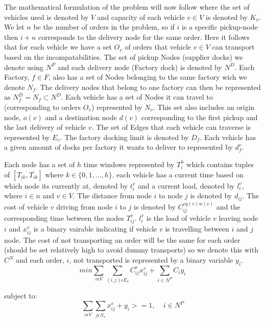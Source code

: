 \documentclass[a4paper,12pt]{article}
\begin{document}
The mathematical formulation of the problem will now follow where the set of vehicles used is denoted by $V$ and capacity of each vehicle $v \in V$ is denoted by $K_v$. We let $n$ be the number of orders in the problem, so if $i$ is a specific pickup-node then $i+n$ corresponds to the delivery node for the same order. Here it follows that for each vehicle we have a set $O_v$ of orders that vehicle $v \in V$ can transport based on the incompatabilities. The set of pickup Nodes (supplier docks) we denote using $N^P$ and each delivery node (Factory dock) is denoted by $N^D$. Each Factory, $f \in F$, also has a set of Nodes belonging to the same factory wich we denote $N_f$. The delivery nodes that belong to one factory can then be represented as $N_f^D = N_f \subset N^D$. Each vehicle has a set of Nodes it can travel to (corresponding to orders $O_v$) represented by $N_v$. This set also includes an origin node, $o(v)$ and a destination node $d(v)$ corresponding to the first pickup and the last delivery of vehicle $v$. The set of Edges that each vehicle can traverse is represented by $E_v$. The factory docking limit is denoted by $D_f$. Each vehicle has a given amount of docks per factory it wants to deliver to represented by $d_{f}^v$. \par 
Each node has a set of $h$ time windows represented by $T_i^h$ which contains tuples of $[ \underline{T_{ik}},  \overline{T_{ik}} ]$ where $k \in \{0,1,...,h\}$. each vehicle has a current time based on which node its currently at, denoted by $t_{i}^v$ and a current load, denoted by $l_{i}^v$, where $i \in n$ and $v \in V$. The distance from node $i$ to node $j$ is denoted by $d_{ij}$. The cost of vehicle $v$ driving from node $i$ to $j$ is denoted by $C_{ij}^{vq(v)w(v)}$ and the corresponding time between the nodes $T_{ij}^v$. $l_{i}^v$ is the load of vehicle $v$ leaving node $i$ and $x_{ij}^v$ is a binary vairable indicating if vehicle $v$ is travelling between $i$ and $j$ node. The cost of not transporting an order will be the same for each order (should be set relatively high to avoid dummy transports) so we denote this with $C^N$ and each order, $i$,  not transported is represented by a binary variable $y_i$. 
\begin{equation}
\label{eq:1}
min\sum_{v\epsilon V} \sum_{(i,j)\epsilon E_v} C_{ij}^vx_{ij}^v + \sum_{i\in N^P}C_iy_i
\end{equation}

subject to:
\begin{equation} \label{eq:2}
\sum_{v\epsilon V}\sum_{j\epsilon N_v} x_{ij}^v + y_i >= 1, ~~~~~ i \in N^P
\end{equation}
\end{document}
